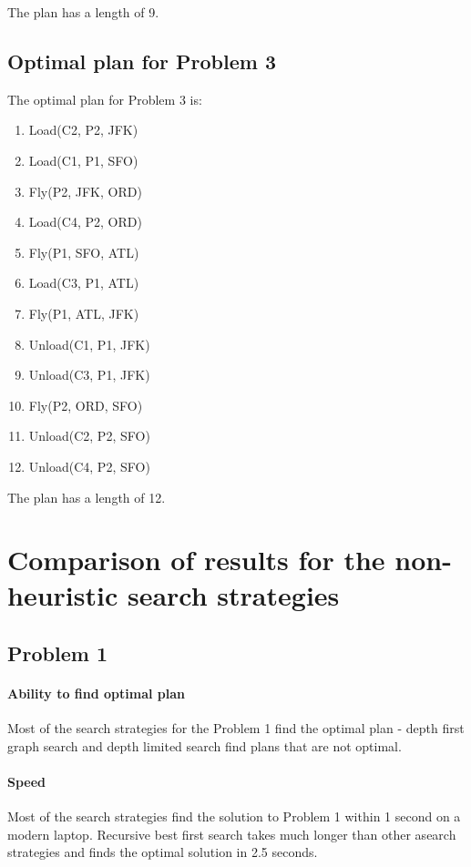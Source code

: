 \documentclass[11pt]{article}
\begin{document}
The plan has a length of 9.

\subsection{Optimal plan for Problem 3}

The optimal plan for Problem 3 is:

\begin{enumerate}
  \item Load(C2, P2, JFK)
  \item Load(C1, P1, SFO)
  \item Fly(P2, JFK, ORD)
  \item Load(C4, P2, ORD)
  \item Fly(P1, SFO, ATL)
  \item Load(C3, P1, ATL)
  \item Fly(P1, ATL, JFK)
  \item Unload(C1, P1, JFK)
  \item Unload(C3, P1, JFK)
  \item Fly(P2, ORD, SFO)
  \item Unload(C2, P2, SFO)
  \item Unload(C4, P2, SFO)
\end{enumerate}

The plan has a length of 12.

\section{Comparison of results for the non-heuristic search strategies}

\subsection{Problem 1}

\paragraph{Ability to find optimal plan}

Most of the search strategies for the Problem 1 find the optimal plan - depth first graph search and depth limited search find plans that are not optimal.

\paragraph{Speed}

Most of the search strategies find the solution to Problem 1 within 1 second on a modern laptop. Recursive best first search takes much longer than other asearch strategies and finds the optimal solution in 2.5 seconds.
\end{document}

